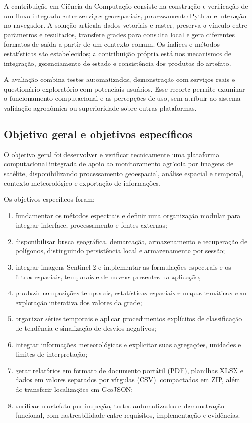 A contribuição em Ciência da Computação consiste na construção e verificação de um fluxo integrado entre serviços geoespaciais, processamento Python e interação no navegador. A solução articula dados vetoriais e raster, preserva o vínculo entre parâmetros e resultados, transfere grades para consulta local e gera diferentes formatos de saída a partir de um contexto comum. Os índices e métodos estatísticos são estabelecidos; a contribuição própria está nos mecanismos de integração, gerenciamento de estado e consistência dos produtos do artefato.

A avaliação combina testes automatizados, demonstração com serviços reais e questionário exploratório com potenciais usuários. Esse recorte permite examinar o funcionamento computacional e as percepções de uso, sem atribuir ao sistema validação agronômica ou superioridade sobre outras plataformas.

\subsection{Objetivo geral e objetivos específicos}

O objetivo geral foi desenvolver e verificar tecnicamente uma plataforma computacional integrada de apoio ao monitoramento agrícola por imagens de satélite, disponibilizando processamento geoespacial, análise espacial e temporal, contexto meteorológico e exportação de informações.

Os objetivos específicos foram:
\begin{enumerate}[leftmargin=3em]
    \item[\textbf{OE1}] fundamentar os métodos espectrais e definir uma organização modular para integrar interface, processamento e fontes externas;
    \item[\textbf{OE2}] disponibilizar busca geográfica, demarcação, armazenamento e recuperação de polígonos, distinguindo persistência local e armazenamento por sessão;
    \item[\textbf{OE3}] integrar imagens Sentinel-2 e implementar as formulações espectrais e os filtros espaciais, temporais e de nuvens presentes na aplicação;
    \item[\textbf{OE4}] produzir composições temporais, estatísticas espaciais e mapas temáticos com exploração interativa dos valores da grade;
    \item[\textbf{OE5}] organizar séries temporais e aplicar procedimentos explícitos de classificação de tendência e sinalização de desvios negativos;
    \item[\textbf{OE6}] integrar informações meteorológicas e explicitar suas agregações, unidades e limites de interpretação;
    \item[\textbf{OE7}] gerar relatórios em formato de documento portátil (PDF), planilhas XLSX e dados em valores separados por vírgulas (CSV), compactados em ZIP, além de transferir localizações em GeoJSON;
    \item[\textbf{OE8}] verificar o artefato por inspeção, testes automatizados e demonstração funcional, com rastreabilidade entre requisitos, implementação e evidências.
\end{enumerate}

